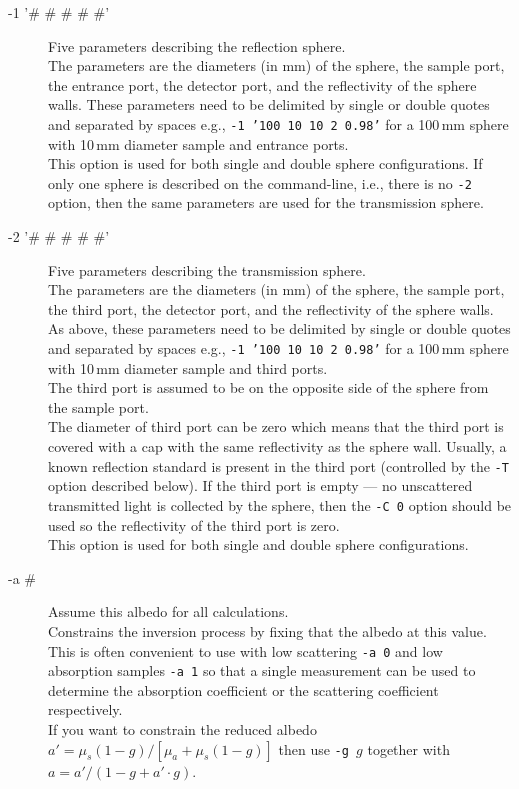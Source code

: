 \documentclass{article}
\begin{document}
\begin{description}
    \item[-1 '\# \# \# \# \#'] Five parameters describing the reflection sphere.\\[1mm]
                 The parameters are the diameters (in mm) of the sphere, the sample port, the entrance port, 
                 the detector port, and the reflectivity of the sphere walls.  These parameters need 
                 to be delimited by single or double quotes and separated by spaces e.g., \texttt{-1 '100 10 10 2 0.98'}
                 for a 100\,mm sphere with 10\,mm diameter sample and entrance ports.\\[1mm]
                 This option is used for both single and double sphere configurations. 
                 If only one sphere is described on the command-line, i.e., there is no \texttt{-2} option, then
                 the same parameters are used for the transmission sphere.

    \item[-2 '\# \# \# \# \#'] Five parameters describing the transmission sphere.\\[1mm]
                 The parameters are the diameters (in mm) of the sphere, the sample port, the third port, 
                 the detector port, and the reflectivity of the sphere walls.  As above, these parameters need 
                 to be delimited by single or double quotes and separated by spaces e.g., \texttt{-1 '100 10 10 2 0.98'}
                 for a 100\,mm sphere with 10\,mm diameter sample and third ports.\\[1mm]
                 The third port is assumed to be on the opposite side of the sphere from the sample port. \\[1mm]
                 The diameter of third port can be zero which means that the third port is
                 covered with a cap with the same reflectivity as the sphere wall.  Usually,
                 a known reflection standard is present in the third port (controlled by the \texttt{-T}
                 option described below).  If the third port is empty --- no unscattered transmitted light
                 is collected by the sphere, then the \texttt{-C 0} option should be used so the reflectivity
                 of the third port is zero.\\[1mm]
                 This option is used for both single and double sphere configurations.

    \item[-a \#] Assume this albedo for all calculations.\\[1mm]
                 Constrains the inversion process by fixing that the albedo at this value.  This 
                 is often convenient to use with low scattering \texttt{-a 0} and low absorption samples \texttt{-a 1}
                 so that a single measurement can be used to determine the absorption coefficient or the scattering
                 coefficient respectively.\\[1mm]
                 If you want to constrain the reduced albedo $a'=\mu_s(1-g)/[\mu_a + \mu_s(1-g)]$ then use \texttt{-g }$g$
                 together with $a = a' / (1 - g + a'\cdot g)$.
                 

\end{description}
\end{document}
